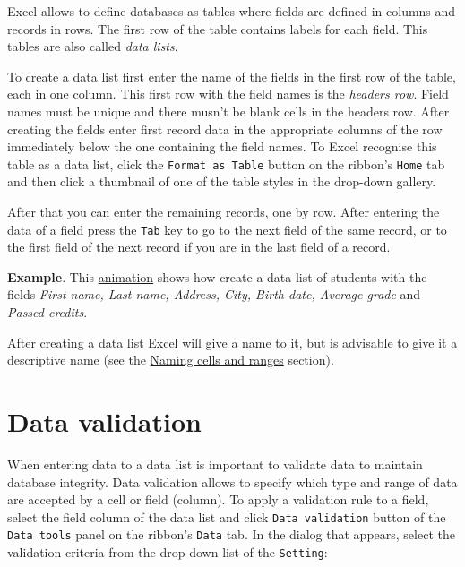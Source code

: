 Excel allows to define databases as tables where fields are defined in columns and records in rows. The first row of the table contains labels for each field. This tables are also called \emph{data lists}.

To create a data list first enter the name of the fields in the first row of the table, each in one column. This first row with the field names is the \emph{headers row}. Field names must be unique and there musn't be blank cells in the headers row. After creating the fields enter first record data in the appropriate columns of the row immediately below the one containing the field names. To Excel recognise this table as a data list, click the \texttt{Format as Table} button on the ribbon’s \texttt{Home} tab and then click a thumbnail of one of the table styles in the drop-down gallery.

After that you can enter the remaining records, one by row. After entering the data of a field press the \texttt{Tab} key to go to the next field of the same record, or to the first field of the next record if you are in the last field of a record.

\textbf{Example}. This \href{http://aprendeconalf.es/office/excel/manual/img/example_database_creation.gif}{animation} shows how create a data list of students with the fields \emph{First name, Last name, Address, City, Birth date, Average grade} and \emph{Passed credits}.

After creating a data list Excel will give a name to it, but is advisable to give it a descriptive name (see the \href{/office/excel/manual/formulas.html\#Namingcellsandranges}{Naming cells and ranges} section).

\section{Data validation}\hypertarget{data-validation}{}\label{data-validation}

When entering data to a data list is important to validate data to maintain database integrity. Data validation allows to specify which type and range of data are accepted by a cell or field (column). To apply a validation rule to a field, select the field column of the data list and click \texttt{Data validation} button of the \texttt{Data tools} panel on the ribbon's \texttt{Data} tab. In the dialog that appears, select the validation criteria from the drop-down list of the \texttt{Setting}:

